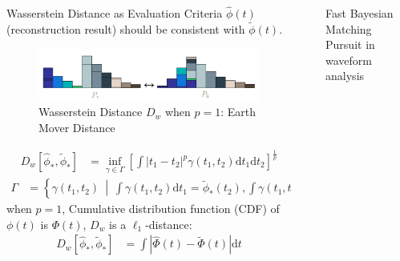 \documentclass[final]{beamer}
\newlength{\sepwidth}
\newlength{\colwidth}
\newcommand{\separatorcolumn}{\begin{column}{\sepwidth}\end{column}}
\begin{document}
\begin{frame}[t]
\begin{columns}[t]
\begin{column}{\colwidth}
\begin{block}{Wasserstein Distance\cite{villani_2009} as Evaluation Criteria}
    $\hat{\phi}(t)$ (reconstruction result) should be consistent with $\tilde{\phi}(t)$. 
    \begin{figure}
      \centering
      \includegraphics[width=0.5\linewidth]{img/WD.png}
      \caption{Wasserstein Distance $D_w$ when $p=1$: Earth Mover Distance}
    \end{figure}
    \begin{align*}
      D_w\left[\hat{\phi}_*, \tilde{\phi}_*\right] &= \inf_{\gamma \in \Gamma} \left[\int \left\vert t_1 - t_2 \right\vert^p \gamma(t_1, t_2)\mathrm{d}t_1\mathrm{d}t_2\right]^{\frac{1}{p}}
    \end{align*}
    \begin{align*}
      \Gamma &= \left\{\gamma(t_1, t_2) ~\middle\vert~ \int\gamma(t_1,t_2)\mathrm{d}t_1 = \tilde{\phi}_*(t_2) , \int\gamma(t_1,t_2)\mathrm{d}t_2 = \hat{\phi}_*(t_1) \right\}
    \end{align*}
    when $p=1$, Cumulative distribution function (CDF) of $\phi(t)$ is $\Phi(t)$, $D_w$ is a $\ell_1$-distance:
    \begin{align*}
      D_w\left[\hat{\phi}_*, \tilde{\phi}_*\right] &= \int\left|\hat{\Phi}(t) - \tilde{\Phi}(t)\right| \mathrm{d}t
    \end{align*}

  \end{block}

\end{column}

\separatorcolumn

\begin{column}{\colwidth}

  \begin{block}{Fast Bayesian Matching Pursuit\cite{schniter_fast_nodate} in waveform analysis}


\end{block}
\end{column}
\end{columns}
\end{frame}
\end{document}
